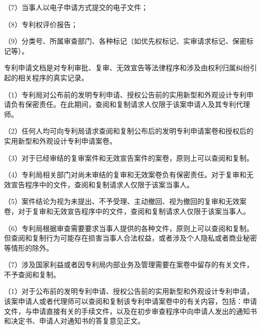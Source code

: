 {\setlength{\parindent}{17.1bp}（7）当事人以电子申请方式提交的电子文件；\par}

{\setlength{\parindent}{17.1bp}（8）专利权评价报告；\par}

{\setlength{\parindent}{17.1bp}（9）分类号、所属审查部门、各种标记（如优先权标记、实审请求标记、保密标记等）。\par}

专利申请文档是对专利审批、复审、无效宣告等法律程序和涉及由权利归属纠纷引起的相关程序的真实记录。

{\setlength{\parindent}{17.1bp}（1）专利局对公布前的发明专利申请、授权公告前的实用新型和外观设计专利申请负有保密责任。在此期间，查阅和复制请求人仅限于该案申请人及其专利代理师。\par}

{\setlength{\parindent}{17.1bp}（2）任何人均可向专利局请求查阅和复制公布后的发明专利申请案卷和授权后的实用新型和外观设计专利申请案卷。\par}

{\setlength{\parindent}{17.1bp}（3）对于已经审结的复审案件和无效宣告案件的案卷，原则上可以查阅和复制。\par}

{\setlength{\parindent}{17.1bp}（4）专利局相关部门对尚未审结的复审和无效案卷负有保密责任。对于复审和无效宣告程序中的文件，查阅和复制请求人仅限于该案当事人。\par}

{\setlength{\parindent}{17.1bp}（5）案件结论为视为未提出、不予受理、主动撤回、视为撤回的复审和无效案卷，对于复审和无效宣告程序中的文件，查阅和复制请求人仅限于该案当事人。\par}

{\setlength{\parindent}{17.1bp}（6）专利局根据审查需要要求当事人提供的各种文件，原则上可以查阅和复制。但查阅和复制行为可能存在损害当事人合法权益，或者涉及个人隐私或者商业秘密等情形的除外。\par}

{\setlength{\parindent}{17.1bp}（7）涉及国家利益或者因专利局内部业务及管理需要在案卷中留存的有关文件，不予查阅和复制。\par}

{\setlength{\parindent}{17.1bp}（1）对于公布前的发明专利申请、授权公告前的实用新型和外观设计专利申请，该案申请人或者代理师可以查阅和复制该专利申请案卷中的有关内容，包括：申请文件，与申请直接有关的手续文件，以及在初步审查程序中向申请人发出的通知书和决定书、申请人对通知书的答复意见正文。\par}

